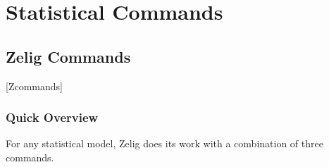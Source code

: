 \documentclass[letterpaper,10pt,english]{sphinxmanual}
\begin{document}
\chapter{Statistical Commands}
\label{4_statistical_commands:statistical-commands}\label{4_statistical_commands::doc}

\section{Zelig Commands}
\label{4_statistical_commands:zelig-commands}
{[}Zcommands{]}


\subsection{Quick Overview}
\label{4_statistical_commands:quick-overview}
For any statistical model, Zelig does its work with a combination of
three commands.
\end{document}
